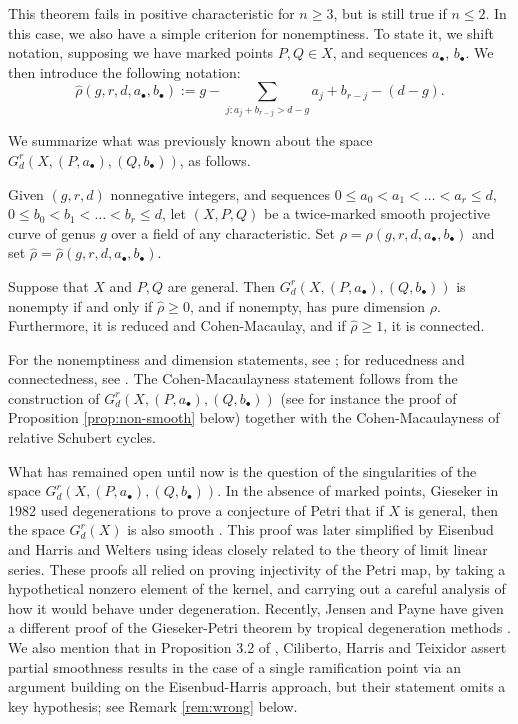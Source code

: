 \documentclass{amsart}
\begin{document}
This theorem fails in positive characteristic
for $n \geq 3$, but is still true if $n \leq 2$.  In this case, we also
have a simple criterion for nonemptiness. To state it, we shift
notation, supposing we have marked points $P,Q\in X$, and sequences
$a_{\bullet}$, $b_{\bullet}$. We then introduce the following notation:
$$\widehat{\rho}(g,r,d,a_\bullet,b_\bullet) :=
g-\sum_{j:a_j+b_{r-j} > d-g} a_j+b_{r-j}-(d-g).$$

We summarize what was previously known about the space 
$G^r_d(X,(P,a_{\bullet}),(Q,b_{\bullet}))$, as follows.

\begin{thm}\label{thm:bg}
Given $(g,r,d)$ nonnegative integers,
and sequences $0 \leq a_0<a_1 <\dots<a_r \leq d$,
$0 \leq b_0<b_1 <\dots<b_r \leq d$, let $(X,P,Q)$ be a twice-marked
smooth projective curve of genus $g$ over a field of any characteristic. 
Set $\rho=\rho(g,r,d,a_{\bullet},b_{\bullet})$ and
set $\widehat{\rho}=\widehat{\rho}(g,r,d,a_{\bullet},b_{\bullet})$. 

Suppose that $X$ and $P,Q$ are general. Then
$G^r_d(X,(P,a_{\bullet}),(Q,b_{\bullet}))$ is nonempty if and only if
$\widehat{\rho} \geq 0$, and if nonempty, has pure dimension
$\rho$. Furthermore, it is reduced and Cohen-Macaulay, and if 
$\widehat{\rho} \geq 1$, it is connected.
\end{thm}

For the nonemptiness and dimension statements, see \cite{os18};
for reducedness and connectedness, see \cite{os26}. The Cohen-Macaulayness
statement follows from the construction of 
$G^r_d(X,(P,a_{\bullet}),(Q,b_{\bullet}))$ (see for instance the proof
of Proposition \ref{prop:non-smooth} below) together with the 
Cohen-Macaulayness of relative Schubert cycles. 

What has remained open until now is the question of the singularities
of the space $G^r_d(X,(P,a_{\bullet}),(Q,b_{\bullet}))$. In the absence of marked points,
Gieseker in 1982 used degenerations to prove a conjecture of 
Petri that if $X$ is general, then the space $G^r_d(X)$ is also smooth 
\cite{gi1}. This proof was later simplified by Eisenbud and Harris
\cite{e-h2} and Welters \cite{we4} using ideas closely related to the
theory of limit linear series. These proofs all relied on proving injectivity 
of the
Petri map, by taking a hypothetical nonzero element of the kernel, and
carrying out a careful analysis of how it would behave under degeneration.
Recently, Jensen and Payne have given a different proof of the 
Gieseker-Petri theorem by tropical degeneration methods \cite{j-p1}.
We also mention that in Proposition 3.2 of \cite{c-h-t1}, Ciliberto,
Harris and Teixidor assert partial smoothness results in
the case of a single ramification point via an argument building on the
Eisenbud-Harris approach, but their statement omits a key hypothesis; 
see Remark \ref{rem:wrong} below. 
\end{document}
